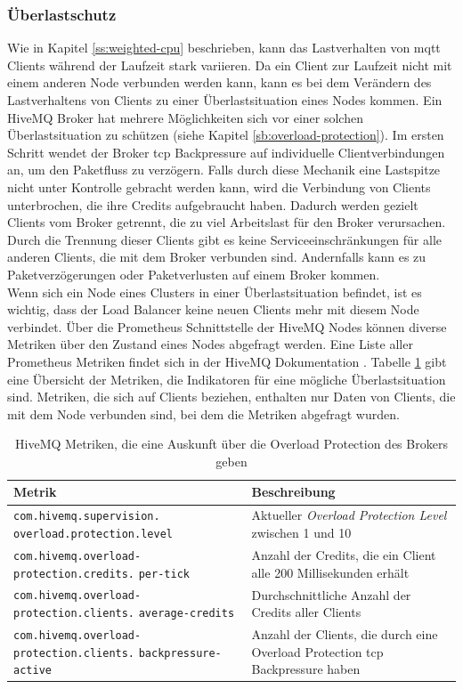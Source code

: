 \subsubsection{Überlastschutz} \label{ss:circuit-breaking}
Wie in Kapitel \ref{ss:weighted-cpu} beschrieben, kann das Lastverhalten von \ac{mqtt} Clients während der Laufzeit stark variieren. Da ein Client zur Laufzeit nicht mit einem anderen Node verbunden werden kann, kann es bei dem Verändern des Lastverhaltens von Clients zu einer Überlastsituation eines Nodes kommen.
Ein HiveMQ Broker hat mehrere Möglichkeiten sich vor einer solchen Überlastsituation zu schützen (siehe Kapitel \ref{sb:overload-protection}).
Im ersten Schritt wendet der Broker \ac{tcp} Backpressure auf individuelle Clientverbindungen an, um den Paketfluss zu verzögern.
Falls durch diese Mechanik eine Lastspitze nicht unter Kontrolle gebracht werden kann, wird die Verbindung von Clients unterbrochen, die ihre Credits aufgebraucht haben.
Dadurch werden gezielt Clients vom Broker getrennt, die zu viel Arbeitslast für den Broker verursachen.
Durch die Trennung dieser Clients gibt es keine Serviceeinschränkungen für alle anderen Clients, die mit dem Broker verbunden sind. Andernfalls kann es zu Paketverzögerungen oder Paketverlusten auf einem Broker kommen.
\\
Wenn sich ein Node eines Clusters in einer Überlastsituation befindet, ist es wichtig, dass der Load Balancer keine neuen Clients mehr mit diesem Node verbindet.
Über die Prometheus Schnittstelle der HiveMQ Nodes können diverse Metriken über den Zustand eines Nodes abgefragt werden.
Eine Liste aller Prometheus Metriken findet sich in der HiveMQ Dokumentation \cite{MonitoringHiveMQDocumentation}.
Tabelle \ref{table:overload-protection-metrics} gibt eine Übersicht der Metriken, die Indikatoren für eine mögliche Überlastsituation sind. Metriken, die sich auf Clients beziehen, enthalten nur Daten von Clients, die mit dem Node verbunden sind, bei dem die Metriken abgefragt wurden.
\begin{table}[htbp]
\centering
\renewcommand{\arraystretch}{1.5}
\begin{tabularx}{\textwidth}{|p{5cm}|X|}
    \hline
    \textbf{Metrik} & \textbf{Beschreibung} \\
    \hline
    \hline
    \verb|com.hivemq.supervision.| \verb|overload.protection.level| & Aktueller \textit{Overload Protection Level} zwischen 1 und 10 \\
    \hline
    \verb|com.hivemq.overload-| \verb|protection.credits.| \verb|per-tick| & Anzahl der Credits, die ein Client alle 200 Millisekunden erhält \\
    \hline
    \verb|com.hivemq.overload-| \verb|protection.clients.| \verb|average-credits| & Durchschnittliche Anzahl der Credits aller Clients \\
    \hline
    \verb|com.hivemq.overload-| \verb|protection.clients.| \verb|backpressure-active| & Anzahl der Clients, die durch eine Overload Protection \ac{tcp} Backpressure haben \\
    \hline
\end{tabularx}
\caption{HiveMQ Metriken, die eine Auskunft über die Overload Protection des Brokers geben}
\label{table:overload-protection-metrics}
\end{table}
